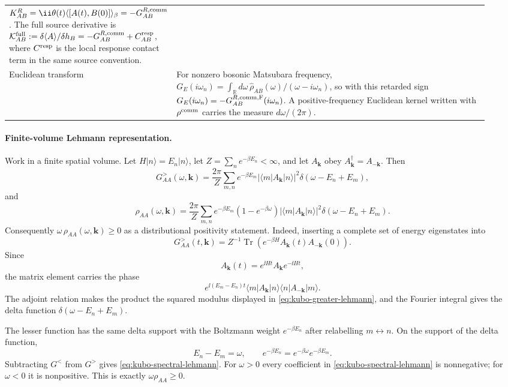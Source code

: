 \begin{center}
\begin{tabular}{@{}>{\raggedright\arraybackslash}p{0.22\linewidth}>{\raggedright\arraybackslash}p{0.71\linewidth}@{}}
\(K^R_{AB}=\ii\theta(t)\langle[A(t),B(0)]\rangle_\beta
=-G^{R,\rm comm}_{AB}\).  The full source derivative is
\(\mathcal K^{\rm full}_{AB}:=\delta\langle A\rangle/\delta h_B
=-G^{R,\rm comm}_{AB}+C^{\rm resp}_{AB}\), where
\(C^{\rm resp}\) is the local response contact term in the same source
convention.\\[0.4em]
Euclidean transform &
For nonzero bosonic Matsubara frequency,
\(G_E(i\omega_n)=
\int_{\mathbb R}d\omega\,\widehat\rho_{AB}(\omega)/
(\omega-i\omega_n)\), so with this retarded sign
\(G_E(i\omega_n)=-G^{R,\rm comm,F}_{AB}(i\omega_n)\).  A
positive-frequency Euclidean kernel written with
\(\rho^{\rm comm}\) carries the measure \(d\omega/(2\pi)\).
\end{tabular}
\end{center}

\paragraph{Finite-volume Lehmann representation.}
Work in a finite spatial volume.  Let \(H|n\rangle=E_n|n\rangle\), let
\(Z=\sum_n e^{-\beta E_n}<\infty\), and let \(A_{\mathbf k}\) obey
\(A_{\mathbf k}^{\dagger}=A_{-\mathbf k}\).  Then
\begin{equation}
  G^>_{AA}(\omega,\mathbf k)
  =
  \frac{2\pi}{Z}\sum_{m,n}
  e^{-\beta E_m}
  |\langle m|A_{\mathbf k}|n\rangle|^2
  \delta(\omega-E_n+E_m),
  \label{eq:kubo-greater-lehmann}
\end{equation}
and
\begin{equation}
  \rho_{AA}(\omega,\mathbf k)
  =
  \frac{2\pi}{Z}\sum_{m,n}
  e^{-\beta E_m}
  \left(1-e^{-\beta\omega}\right)
  |\langle m|A_{\mathbf k}|n\rangle|^2
  \delta(\omega-E_n+E_m).
  \label{eq:kubo-spectral-lehmann}
\end{equation}
Consequently \(\omega\,\rho_{AA}(\omega,\mathbf k)\ge0\) as a
distributional positivity statement.
Indeed, inserting a complete set of energy eigenstates into
\[
  G^>_{AA}(t,\mathbf k)
  =
  Z^{-1}\operatorname{Tr}
  \left(e^{-\beta H}A_{\mathbf k}(t)A_{-\mathbf k}(0)\right).
\]
Since
\[
  A_{\mathbf k}(t)
  =
  e^{\ii Ht}A_{\mathbf k}e^{-\ii Ht},
\]
the matrix element carries the phase
\[
  e^{\ii(E_m-E_n)t}
  \langle m|A_{\mathbf k}|n\rangle
  \langle n|A_{-\mathbf k}|m\rangle .
\]
The adjoint relation makes the product the squared modulus displayed in
\eqref{eq:kubo-greater-lehmann}, and the Fourier integral gives the delta
function \(\delta(\omega-E_n+E_m)\).

The lesser function has the same delta support with the Boltzmann weight
\(e^{-\beta E_n}\) after relabelling \(m\leftrightarrow n\).  On the support
of the delta function,
\[
  E_n-E_m=\omega,
  \qquad
  e^{-\beta E_n}=e^{-\beta\omega}e^{-\beta E_m}.
\]
Subtracting \(G^<\) from \(G^>\) gives
\eqref{eq:kubo-spectral-lehmann}.  For \(\omega>0\) every coefficient in
\eqref{eq:kubo-spectral-lehmann} is nonnegative; for \(\omega<0\) it is
nonpositive.  This is exactly \(\omega\rho_{AA}\ge0\).

